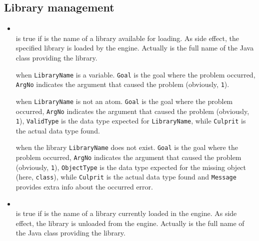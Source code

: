 \subsection{Library management}
\label{ssec:library-management}

\begin{itemize}

\item {}\\
     is true if  is the name of a \tuprolog{} library available for loading. As side effect, the specified library is loaded by the engine. Actually  is the full name of the Java class providing the library.


     when \texttt{LibraryName} is a variable. \texttt{Goal} is the goal where the problem occurred, \texttt{ArgNo} indicates the argument that caused the problem (obviously, \texttt{1}).

     when \texttt{LibraryName} is not an atom. \texttt{Goal} is the goal where the problem occurred, \texttt{ArgNo} indicates the argument that caused the problem (obviously, \texttt{1}), \texttt{ValidType} is the data type expected for \texttt{LibraryName}, while \texttt{Culprit} is the actual data type found.

     when the library \texttt{LibraryName} does not exist. \texttt{Goal} is the goal where the problem occurred, \texttt{ArgNo} indicates the argument that caused the problem (obviously, \texttt{1}), \texttt{ObjectType} is the data type expected for the missing object (here, \texttt{class}), while \texttt{Culprit} is the actual data type found and \texttt{Message} provides extra info about the occurred error.

 \item {}\\
    \noindent{} is true if  is the name of a library currently loaded in the engine. As side effect, the library is unloaded from the engine. Actually  is the full name of the Java class providing the library.


\end{itemize}

